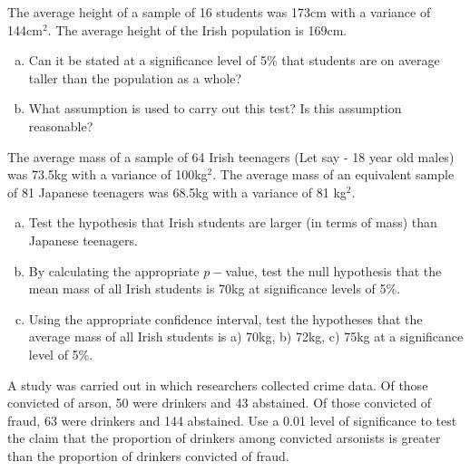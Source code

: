 

\item The average height of a sample of 16 students was 173cm with a variance of 144cm$^2$. The average height of the Irish population is 169cm. 
\begin{enumerate}[(a)]
\item Can it be stated at a significance level of 5\% that students are on average taller than the population as a whole? 
\item What assumption is used to carry out this test? Is this assumption reasonable?
\end{enumerate}


\item 
The average mass of a sample of 64 Irish teenagers (Let say - 18 year old males) was 73.5kg with a variance of 100kg$^2$. 
The average mass of an equivalent sample of 81 Japanese teenagers was 68.5kg with a variance of 81 kg$^2$. 
\begin{enumerate}[(a)]
\item Test the hypothesis that Irish students are larger (in terms of mass) than Japanese teenagers.
\item By calculating the appropriate $p-$value, test the null hypothesis that the mean mass of all Irish students is 70kg at significance levels of 5\%. 
\item Using the appropriate confidence interval, test the hypotheses that the average mass of all Irish students is a) 70kg, b) 72kg, c) 75kg at a significance level of 5\%.
\end{enumerate}




\item A study was carried out in which researchers collected crime data. Of those convicted of
arson, 50 were drinkers and 43 abstained. Of those convicted of fraud, 63 were drinkers and 144
abstained. Use a 0.01 level of significance to test the claim that the proportion of drinkers among
convicted arsonists is greater than the proportion of drinkers convicted of fraud.



